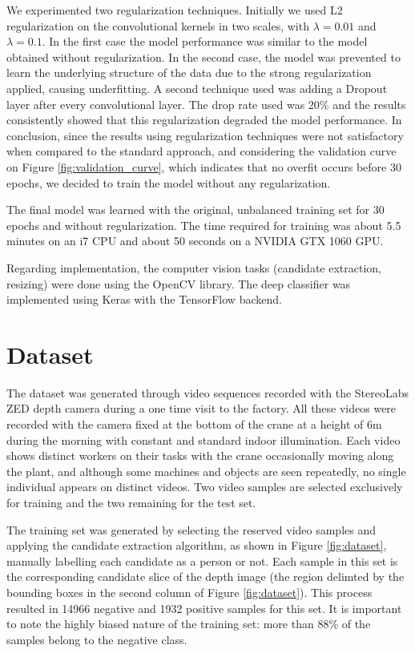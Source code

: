         We experimented two regularization techniques. Initially we used L2 regularization on the convolutional kernels in two scales, with $\lambda = 0.01$ and $\lambda = 0.1$. In the first case the model performance was similar to the model obtained without regularization. In the second case, the model was prevented to learn the underlying structure of the data due to the strong regularization applied, causing underfitting. A second technique used was adding a Dropout layer after every convolutional layer. The drop rate used was 20\% and the results consistently showed that this regularization degraded the model performance. In conclusion, since the results using regularization techniques were not satisfactory when compared to the standard approach, and considering the validation curve on Figure \ref{fig:validation_curve}, which indicates that no overfit occurs before 30 epochs, we decided to train the model without any regularization.        

        The final model was learned with the original, unbalanced training set for 30 epochs and without regularization. The time required for training was about 5.5 minutes on an i7 CPU and about 50 seconds on a NVIDIA GTX 1060 GPU.

        Regarding implementation, the computer vision tasks (candidate extraction, resizing) were done using the OpenCV library. The deep classifier was implemented using Keras \cite{keras} with the TensorFlow \cite{tensorflow2015-whitepaper} backend.

\section{Dataset}
\label{sec:dataset}
The dataset was generated through video sequences recorded with the StereoLabs ZED depth camera during a one time visit to the factory. All these videos were recorded with the camera fixed at the bottom of the crane at a height of 6m during the morning with constant and standard indoor illumination. Each video shows distinct workers on their tasks with the crane occasionally moving along the plant, and although some machines and objects are seen repeatedly, no single individual appears on distinct videos. Two video samples are selected exclusively for training and the two remaining for the test set.

The training set was generated by selecting the reserved video samples and applying the candidate extraction algorithm, as shown in Figure \ref{fig:dataset}, manually labelling each candidate as a person or not. Each sample in this set is the corresponding candidate slice of the depth image (the region delimted by the bounding boxes in the second column of Figure \ref{fig:dataset}). This process resulted in 14966 negative and 1932 positive samples for this set. It is important to note the highly biased nature of the training set: more than 88\% of the samples belong to the negative class.

